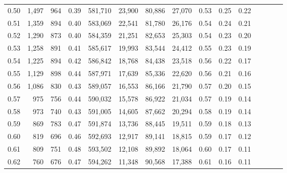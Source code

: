 \begin{tabular}{rrrcrrrrrrrrrrr}
0.50 &   1,497 &    964 &                                       0.39 &  581,710 &   23,900 &   80,886 &   27,070 &  0.53 &  0.25 &                         0.22 \\
0.51 &   1,359 &    894 &                                       0.40 &  583,069 &   22,541 &   81,780 &   26,176 &  0.54 &  0.24 &                         0.21 \\
0.52 &   1,290 &    873 &                                       0.40 &  584,359 &   21,251 &   82,653 &   25,303 &  0.54 &  0.23 &                         0.20 \\
0.53 &   1,258 &    891 &                                       0.41 &  585,617 &   19,993 &   83,544 &   24,412 &  0.55 &  0.23 &                         0.19 \\
0.54 &   1,225 &    894 &                                       0.42 &  586,842 &   18,768 &   84,438 &   23,518 &  0.56 &  0.22 &                         0.17 \\
0.55 &   1,129 &    898 &                                       0.44 &  587,971 &   17,639 &   85,336 &   22,620 &  0.56 &  0.21 &                         0.16 \\
0.56 &   1,086 &    830 &                                       0.43 &  589,057 &   16,553 &   86,166 &   21,790 &  0.57 &  0.20 &                         0.15 \\
0.57 &     975 &    756 &                                       0.44 &  590,032 &   15,578 &   86,922 &   21,034 &  0.57 &  0.19 &                         0.14 \\
0.58 &     973 &    740 &                                       0.43 &  591,005 &   14,605 &   87,662 &   20,294 &  0.58 &  0.19 &                         0.14 \\
0.59 &     869 &    783 &                                       0.47 &  591,874 &   13,736 &   88,445 &   19,511 &  0.59 &  0.18 &                         0.13 \\
0.60 &     819 &    696 &                                       0.46 &  592,693 &   12,917 &   89,141 &   18,815 &  0.59 &  0.17 &                         0.12 \\
0.61 &     809 &    751 &                                       0.48 &  593,502 &   12,108 &   89,892 &   18,064 &  0.60 &  0.17 &                         0.11 \\
0.62 &     760 &    676 &                                       0.47 &  594,262 &   11,348 &   90,568 &   17,388 &  0.61 &  0.16 &                         0.11 \\

\end{tabular}
